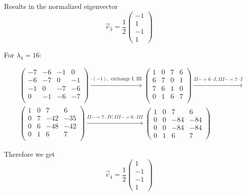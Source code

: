 \documentclass[a4paper,german,12pt,smallheadings]{scrartcl}
\begin{document}
\begin{enumerate}[a)]
    Results in the normalized eigenvector
    \begin{equation*}
      \vec{v}_3 = \frac{1}{2} \begin{pmatrix} -1 \\ 1 \\ -1 \\ 1 \end{pmatrix}
    \end{equation*}

    For $\lambda_4 = 16$:

    \begin{align*}
      &\begin{pmatrix}
        -7 & -6 & -1 & 0 \\
        -6 & -7 & 0 & -1 \\
        -1 & 0 & -7 & -6 \\
        0 & -1 & -6 & -7 \\
      \end{pmatrix}
      \xrightarrow{\cdot (-1),\text{ exchange I, III}}
      \begin{pmatrix}
        1 & 0 & 7 & 6 \\
        6 & 7 & 0 & 1 \\
        7 & 6 & 1 & 0 \\
        0 & 1 & 6 & 7 \\
      \end{pmatrix}
      \xrightarrow{II-=6\cdot I, III -= 7 \cdot I} \\
      &\begin{pmatrix}
        1 & 0 & 7 & 6 \\
        0 & 7 & -42 & -35 \\
        0 & 6 & -48 & -42 \\
        0 & 1 & 6 & 7 \\
      \end{pmatrix}
      \xrightarrow{II-=7 \cdot IV, III -= 6 \cdot III}
      \begin{pmatrix}
        1 & 0 & 7 & 6 \\
        0 & 0 & -84 & -84 \\
        0 & 0 & -84 & -84 \\
        0 & 1 & 6 & 7
      \end{pmatrix}
    \end{align*}

    Therefore we get
    \begin{equation*}
      \vec{v}_4 = \frac{1}{2} \begin{pmatrix} 1 \\ -1 \\ -1 \\ 1\end{pmatrix}
    \end{equation*}


\end{enumerate}
\end{document}
